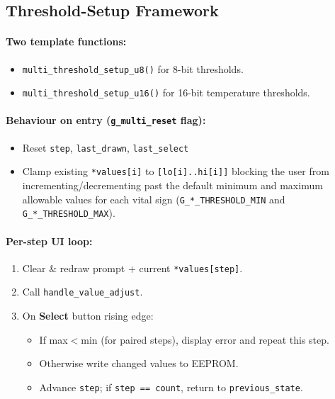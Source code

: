 \subsection{Threshold-Setup Framework}
\paragraph{Two template functions:}
\begin{itemize}
	\item \lstinline|multi_threshold_setup_u8()| for 8-bit thresholds.
	\item \lstinline|multi_threshold_setup_u16()| for 16-bit temperature thresholds.
\end{itemize}
\paragraph{Behaviour on entry (\lstinline|g_multi_reset| flag):}
\begin{itemize}
	\item Reset \lstinline|step|, \lstinline|last_drawn|, \lstinline|last_select|
	\item Clamp existing \lstinline|*values[i]| to \lstinline|[lo[i]..hi[i]]| blocking the user from incrementing/decrementing past the default minimum and maximum allowable values for each vital sign (\lstinline|G_*_THRESHOLD_MIN| and \lstinline|G_*_THRESHOLD_MAX|).
\end{itemize}
\paragraph{Per-step UI loop:}
\begin{enumerate}
	\item Clear \& redraw prompt + current \lstinline|*values[step]|.
	\item Call \lstinline|handle_value_adjust|.
	\item On \textbf{Select} button rising edge:
	\begin{itemize}
		\item If max$<$min (for paired steps), display error and repeat this step.
		\item Otherwise write changed values to EEPROM.
		\item Advance \lstinline|step|; if \lstinline|step == count|, return to \lstinline|previous_state|.
	\end{itemize}
\end{enumerate}

